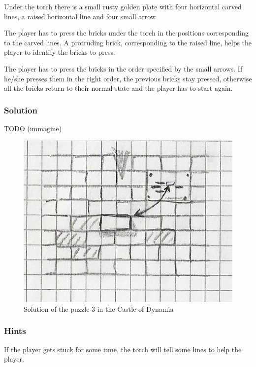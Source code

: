 

Under the torch there is a small rusty golden plate with four horizontal carved lines, a raised horizontal line and four small arrow

The player has to press the bricks under the torch in the positions corresponding to the carved lines. A protruding brick, corresponding to the raised line, helps the player to identify the bricks to press.

The player has to press the bricks in the order specified by the small arrows. If he/she presses them in the right order, the previous bricks stay pressed, otherwise all the bricks return to their normal state and the player has to start again.

\subsubsection*{Solution}
TODO (immagine)
\begin{figure}[H]
  \centering
  \includegraphics[width=\textwidth]{Images/Puzzles/castleOfDynamia_3}
  \caption{Solution of the puzzle 3 in the Castle of Dynamia}
\end{figure}

\subsubsection*{Hints}
If the player gets stuck for some time, the torch will tell some lines to help the player.

